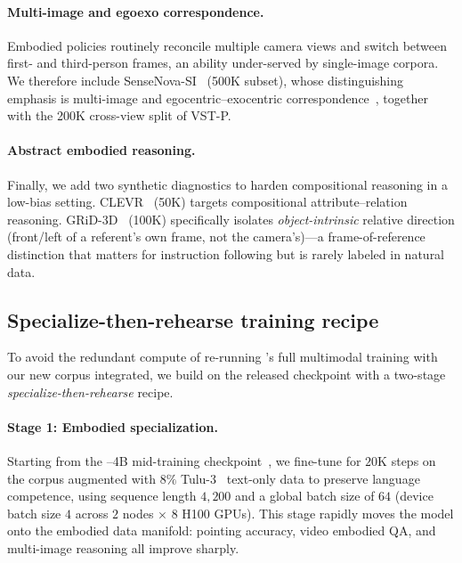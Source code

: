 \paragraph{Multi-image and ego\textendash exo correspondence.}
Embodied policies routinely reconcile multiple camera views and switch
between first- and third-person frames, an ability under-served by
single-image corpora. We therefore include SenseNova-SI~\citep{cai2026scalingspatialintelligencemultimodal}
(500K subset), whose distinguishing emphasis is multi-image and
egocentric--exocentric correspondence~\citep{grauman2024egoexo4dunderstandingskilledhuman},
together with the 200K cross-view split of VST-P.

\paragraph{Abstract embodied reasoning.}
Finally, we add two synthetic diagnostics to harden compositional reasoning
in a low-bias setting. CLEVR~\citep{johnson2016clevrdiagnosticdatasetcompositional}
(50K) targets compositional attribute--relation reasoning. GRiD-3D~\citep{lee_grid3d_2022}
(100K) specifically isolates \emph{object-intrinsic} relative direction
(front/left of a referent's own frame, not the camera's)---a
frame-of-reference distinction that matters for instruction following but is
rarely labeled in natural data.

\subsection{Specialize-then-rehearse training recipe}
\label{sec:molmoer-training}

To avoid the redundant compute of re-running \molmot's full multimodal training with our new corpus integrated, we build on the released \molmot checkpoint with a two-stage \emph{specialize-then-rehearse} recipe.

\paragraph{Stage 1: Embodied specialization.}
Starting from the \molmot--4B mid-training checkpoint~\citep{deitke2024molmo,qwen3}, we fine-tune for $20$K steps on the \molmoer corpus augmented with $8\%$ Tulu-3~\citep{lambert2025tulu3pushingfrontiers} text-only data to preserve language competence, using sequence length $4{,}200$ and a global batch size of $64$ (device batch size $4$ across $2$ nodes $\times$ $8$ H100 GPUs). This stage rapidly moves the model onto the embodied data manifold: pointing accuracy, video embodied QA, and multi-image reasoning all improve sharply.

